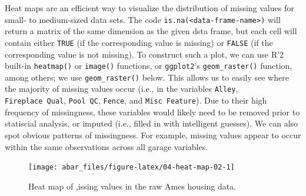 \documentclass[]{book}
\newenvironment{Shaded}{\begin{snugshade}}{\end{snugshade}}
\newcommand{\DataTypeTok}[1]{\textcolor[rgb]{0.13,0.29,0.53}{#1}}
\newcommand{\DecValTok}[1]{\textcolor[rgb]{0.00,0.00,0.81}{#1}}
\newcommand{\KeywordTok}[1]{\textcolor[rgb]{0.13,0.29,0.53}{\textbf{#1}}}
\newcommand{\NormalTok}[1]{#1}
\newcommand{\OperatorTok}[1]{\textcolor[rgb]{0.81,0.36,0.00}{\textbf{#1}}}
\newcommand{\StringTok}[1]{\textcolor[rgb]{0.31,0.60,0.02}{#1}}
\theoremstyle{definition}
\theoremstyle{definition}
\theoremstyle{definition}
\theoremstyle{remark}
\begin{document}
Heat maps are an efficient way to visualize the distribution of missing
values for small- to medium-sized data sets. The code
\texttt{is.na(\textless{}data-frame-name\textgreater{})} will return a
matrix of the same dimension as the given dsta frame, but each cell will
contain either \texttt{TRUE} (if the corresponding value is missing) or
\texttt{FALSE} (if the corresponding value is not missing). To construct
such a plot, we can use R'2 built-in \texttt{heatmap()} or
\texttt{image()} functions, or \texttt{ggplot2}'s
\texttt{geom\_raster()} function, among others; we use
\texttt{geom\_raster()} below. This allows us to easily see where the
majority of missing values occur (i.e., in the variables \texttt{Alley},
\texttt{Fireplace\ Qual}, \texttt{Pool\ QC}, \texttt{Fence}, and
\texttt{Misc\ Feature}). Due to their high frequency of missingness,
these variables would likely need to be removed prior to statiscial
analysis, or imputed (i.e., filled in with intelligent guesses). We can
also spot obvious patterns of missingness. For example, missing values
appear to occur within the same observations across all garage
variables.

\begin{Shaded}
\end{Shaded}

\begin{figure}

{\centering \texttt{[image: abar\_files/figure-latex/04-heat-map-02-1]} 

}

\caption{Heat map of ,issing values in the raw Ames housing data.}\label{fig:04-heat-map-02}
\end{figure}
\end{document}
